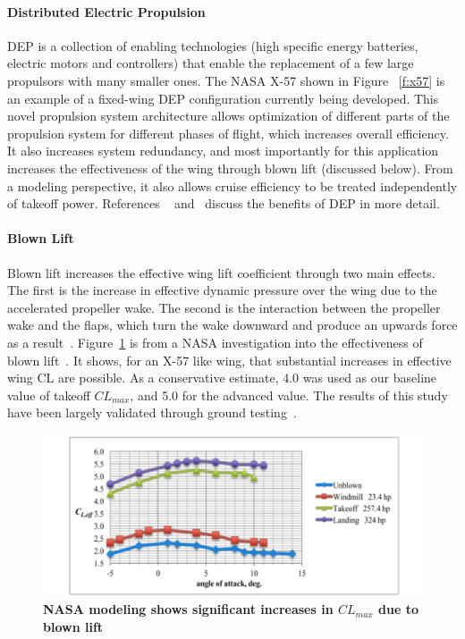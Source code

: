 \documentclass[]{aiaa-tc}%
\begin{document}
\paragraph{Distributed Electric Propulsion}
DEP is a collection of enabling technologies (high specific energy batteries, electric motors and controllers) that enable the replacement of a few large propulsors with many smaller ones.  The NASA X-57 shown in Figure ~\ref{f:x57} is an example of a fixed-wing DEP configuration currently being developed.   This novel propulsion system architecture allows optimization of different parts of the propulsion system for different phases of flight, which increases overall efficiency.  It also increases system redundancy, and most importantly for this application increases the effectiveness of the wing through blown lift (discussed below).  From a modeling perspective, it also allows cruise efficiency to be treated independently of takeoff power.  References ~\cite{StollDEP} and~\cite{MooreDEP} discuss the benefits of DEP in more detail. 

\paragraph{Blown Lift}
Blown lift increases the effective wing lift coefficient through two main effects.  The first is the increase in effective dynamic pressure over the wing due to the accelerated propeller wake.  The second is the interaction between the propeller wake and the flaps, which turn the wake downward and produce an upwards force as a result~\cite{MooreDEP}.  Figure~\ref{f:blown_lift} is from a NASA investigation into the effectiveness of blown lift~\cite{Deere}.  It shows, for an X-57 like wing, that substantial increases in effective wing CL are possible.  As a conservative estimate, 4.0 was used as our baseline value of takeoff $CL_{max}$, and 5.0 for the advanced value.  The results of this study have been largely validated through ground testing~\cite{Stoll2015}. 

 \begin{figure}[!h]
 	\begin{center}
 	\includegraphics[width = 1.\textwidth]{blown_lift_chart.pdf}
     \caption{\textbf{NASA modeling shows significant increases in $CL_{max}$ due to blown lift~\cite{Deere}}}
 	\label{f:blown_lift}
 	\end{center}
 \end{figure}
 
\end{document}
